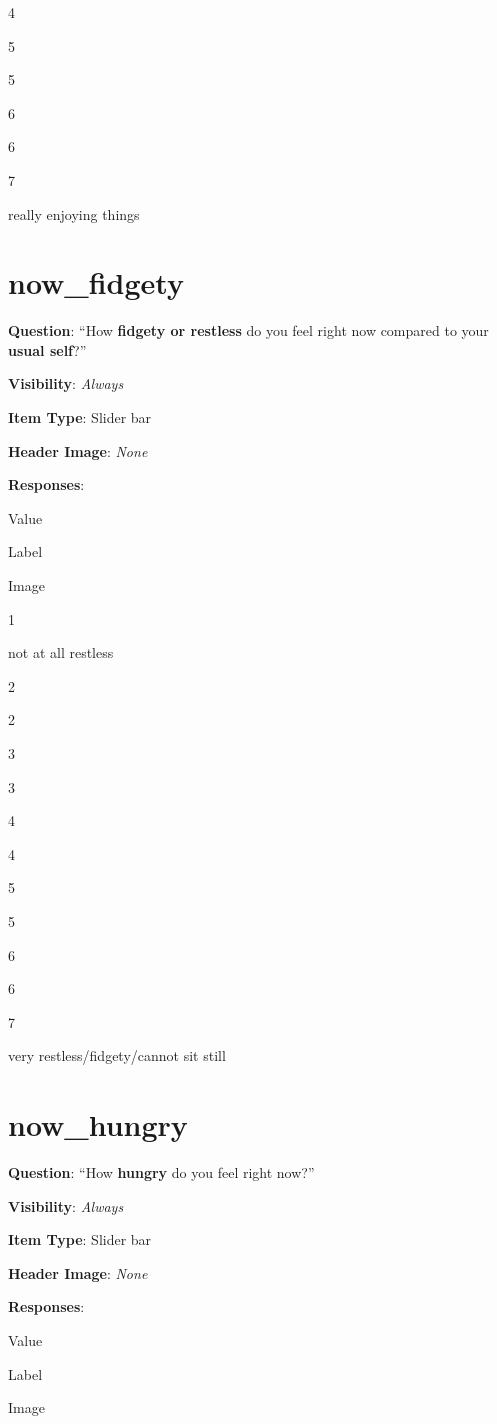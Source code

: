 \documentclass[]{book}
\begin{document}
4

5

5

6

6

7

really enjoying things

\hypertarget{now_fidgety}{%
\section{now\_fidgety}\label{now_fidgety}}

\textbf{Question}: ``How \textbf{fidgety or restless} do you feel right now compared to your \textbf{usual self}?''

\textbf{Visibility}: \emph{Always}

\textbf{Item Type}: Slider bar

\textbf{Header Image}: \emph{None}

\textbf{Responses}:

Value

Label

Image

1

not at all restless

2

2

3

3

4

4

5

5

6

6

7

very restless/fidgety/cannot sit still

\hypertarget{now_hungry}{%
\section{now\_hungry}\label{now_hungry}}

\textbf{Question}: ``How \textbf{hungry} do you feel right now?''

\textbf{Visibility}: \emph{Always}

\textbf{Item Type}: Slider bar

\textbf{Header Image}: \emph{None}

\textbf{Responses}:

Value

Label

Image
\end{document}
